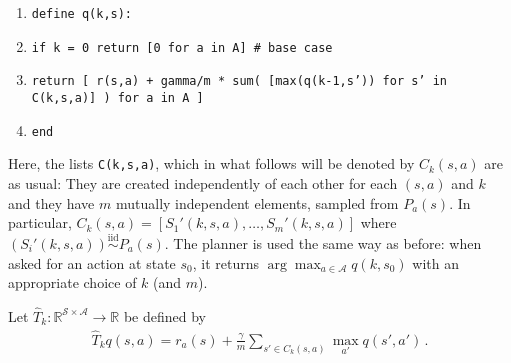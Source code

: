 \documentclass{article}
\newcommand{\R}{\mathbb{R}}
\DeclareMathOperator*{\1}{\mathbbm{1}}
\newcommand{\0}{\mathbf{0}}
\theoremstyle{definition}
\theoremstyle{remark}
\newcommand{\cS}{\mathcal{S}}
\newcommand{\cA}{\mathcal{A}}
\begin{document}
\begin{enumerate}
\item {\tt define q(k,s):}
\item {\tt if k = 0 return [0 for a in A] \# base case}
\item {\tt return [ r(s,a) + gamma/m * sum( [max(q(k-1,s')) for s' in C(k,s,a)] ) for a in A ]}
\item {\tt end}
\end{enumerate}

Here, the lists {\tt C(k,s,a)}, which in what follows will be denoted by $C_k(s,a)$ are as usual: They are created independently of each other for each $(s,a)$ and $k$ and they have $m$ mutually independent elements, sampled from $P_a(s)$.
In particular, $C_k(s,a) = [S_1'(k,s,a), \dots, S_m'(k,s,a)]$ where $(S_i'(k,s,a))\stackrel{\textrm{iid}}{\sim} P_a(s)$.
The planner is used the same way as before: when asked for an action at state $s_0$, it returns $\arg\max_{a\in \cA} q(k,s_0)$ with an appropriate choice of $k$ (and $m$).


Let $\hat T_k: \R^{\cS \times \cA} \to \R$ be defined by 
\begin{align*}
\hat T_k q (s,a) = r_a(s) + \frac{\gamma}{m} \sum_{s'\in C_k(s,a)} \max_{a'} q(s',a')\,.
\end{align*}
\end{document}
